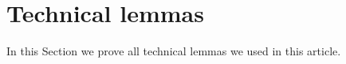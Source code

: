 \documentclass[12pt]{amsart}
\theoremstyle{plain}
\newtheorem{lemma}{Lemma}[section]
\theoremstyle{remark}
\begin{document}
\section{Technical lemmas}
\label{sec:technical}

In this Section we prove all technical lemmas we used in this article.

\end{document}
